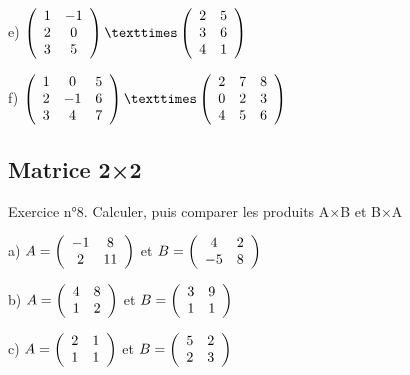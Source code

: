 \begin{minipage}[c]{.45\linewidth}
e)
$\left( \begin{array}{ c c }
 1 & -1 \\ 2 & 0 \\ 3 & 5
\end{array} \right)
×
\left( \begin{array}{ c c }
 2 & 5 \\ 3 & 6 \\ 4 & 1
\end{array} \right)$
\end{minipage}
\hfill
\begin{minipage}[c]{.45\linewidth}
f)
$\left( \begin{array}{ c c c }
 1 & 0 & 5 \\ 2 & -1 & 6 \\ 3 & 4 & 7 \\
\end{array} \right)
×
\left( \begin{array}{ c c c }
 2 & 7 & 8 \\ 0 & 2 & 3 \\ 4 & 5 & 6 \\
\end{array} \right)$
\end{minipage}

\subsection{Matrice 2×2}
Exercice n°8. Calculer, puis comparer les produits A×B et B×A

\begin{center}
a)
$ A = 
\left( \begin{array}{ c c }
 -1 & 8 \\ 2 & 11
\end{array} \right)$
et
$B =
\left( \begin{array}{ c c }
4 & 2 \\ -5 & 8
\end{array} \right)$
\end{center}

\begin{minipage}[c]{.45\linewidth}
b)
$ A = 
\left( \begin{array}{ c c }
 4 & 8 \\ 1 & 2
\end{array} \right)$
et
$ B = 
\left( \begin{array}{ c c }
 3 & 9 \\ 1 & 1
\end{array} \right)$
\end{minipage}
\hfill
\begin{minipage}[c]{.45\linewidth}
c)
$ A = 
\left( \begin{array}{ c c }
 2 & 1 \\ 1 & 1
\end{array} \right)$
et
$ B = 
\left( \begin{array}{ c c }
 5 & 2 \\ 2 & 3
\end{array} \right)$
\end{minipage}

